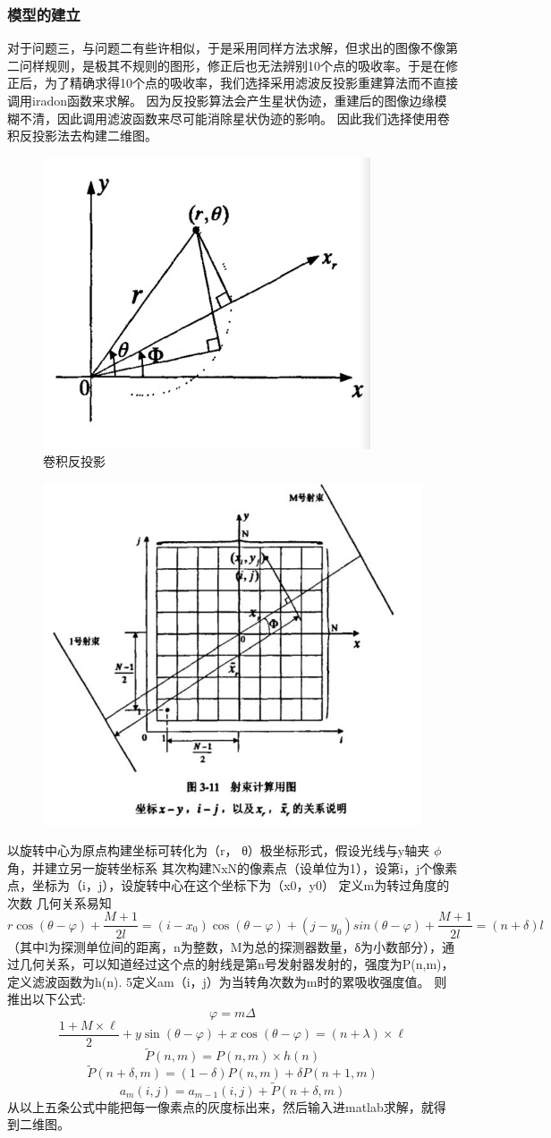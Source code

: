 \documentclass[withoutpreface,bwprint]{cumcmthesis} %
\begin{document}
\subsubsection {模型的建立}
对于问题三，与问题二有些许相似，于是采用同样方法求解，但求出的图像不像第二问样规则，是极其不规则的图形，修正后也无法辨别10个点的吸收率。于是在修正后，为了精确求得10个点的吸收率，我们选择采用滤波反投影重建算法而不直接调用iradon函数来求解。
因为反投影算法会产生星状伪迹，重建后的图像边缘模糊不清，因此调用滤波函数来尽可能消除星状伪迹的影响。
因此我们选择使用卷积反投影法去构建二维图。
\begin{figure}[H]
\centering
\includegraphics[width=.6\textwidth]{5.png}
\caption{卷积反投影}
\end{figure}
\begin{figure}[H]
\centering
\includegraphics[width=.6\textwidth]{4.png}
\end{figure}
以旋转中心为原点构建坐标可转化为（r， θ）极坐标形式，假设光线与y轴夹 $\phi$角，并建立另一旋转坐标系
其次构建NxN的像素点（设单位为1），设第i，j个像素点，坐标为（i，j），设旋转中心在这个坐标下为（x0，y0）
定义m为转过角度的次数
几何关系易知
$$r\cos(\theta-\varphi )+\frac{M+1}{2l}=(i-x_0)\cos(\theta-\varphi )+(j-y_0)sin(\theta-\varphi)+\frac{M+1}{2l}=(n+\delta)l $$（其中l为探测单位间的距离，n为整数，M为总的探测器数量，δ为小数部分），通过几何关系，可以知道经过这个点的射线是第n号发射器发射的，强度为P(n,m)，定义滤波函数为h(n).
5定义am（i，j）为当转角次数为m时的累吸收强度值。
则推出以下公式:
$$\varphi = m\Delta$$
$$\frac{1+ M\times \ell}{2} + y\sin{(\theta-\varphi)} + x\cos{(\theta-\varphi)}=(n+\lambda)\times \ell$$
$$\tilde P(n,m) = P(n,m)\times h(n)$$
$$ \tilde P(n+\delta,m) = (1-\delta)P(n,m)+\delta P(n+1, m)$$
$$ a_m(i,j) = a_{m-1}(i,j)+\tilde P(n+\delta, m)$$
从以上五条公式中能把每一像素点的灰度标出来，然后输入进matlab求解，就得到二维图。
\end{document}
